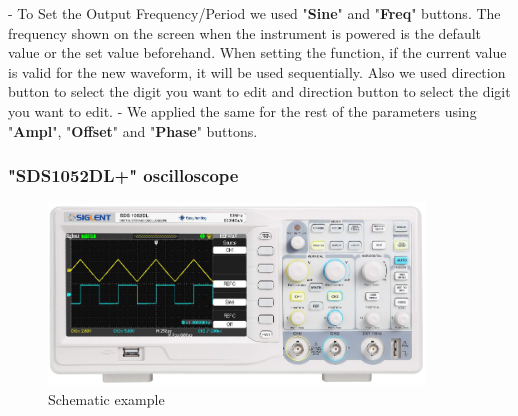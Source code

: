  - To Set the Output Frequency/Period we used "\textbf{Sine}" and "\textbf{Freq}" buttons.
   The frequency shown on the screen when the instrument is powered is
   the default value or the set value beforehand. When setting the function,
   if the current value is valid for the new waveform, it will be used
   sequentially. Also we used direction button to select the digit you want to edit and direction button to select the digit you want to edit.
 - We applied the same for the rest of the parameters using "\textbf{Ampl}", "\textbf{Offset}" and "\textbf{Phase}" buttons.

\subsubsection*{"SDS1052DL+" oscilloscope}
\begin{figure}[H]
	\centering
	\includegraphics[width=10cm]{images/16.png}
	\caption{Schematic example}
	\label{fig:wow6}
\end{figure}

